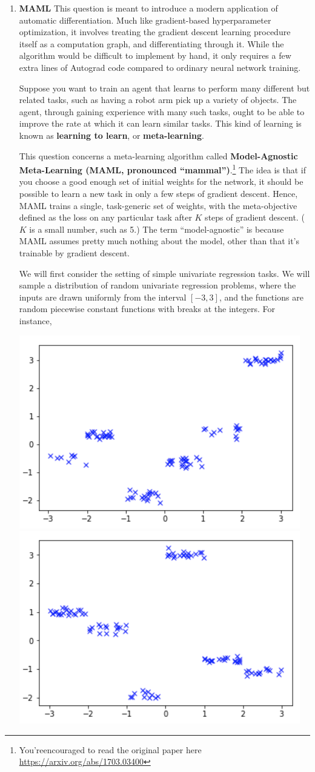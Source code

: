 \documentclass[11pt]{article}
\begin{document}
\begin{enumerate}
\item {\bf MAML} This question is meant to introduce a modern application of automatic differentiation. Much like gradient-based hyperparameter optimization, it involves treating the gradient descent learning procedure itself as a computation graph, and differentiating through it. While the algorithm would be difficult to implement by hand, it only requires a few extra lines of Autograd code compared to ordinary neural network training.

Suppose you want to train an agent that learns to perform many different but related tasks, such as having a robot arm pick up a variety of objects. The agent, through gaining experience with many such tasks, ought to be able to improve the rate at which it can learn similar tasks. This kind of learning is known as \textbf{learning to learn}, or \textbf{meta-learning}.

This question concerns a meta-learning algorithm called \textbf{Model-Agnostic Meta-Learning (MAML, pronounced ``mammal'')}.\footnote{You'reencouraged to read the original paper here \url{https://arxiv.org/abs/1703.03400}} The idea is that if you choose a good enough set of initial weights for the network, it should be possible to learn a new task in only a few steps of gradient descent. Hence, MAML trains a single, task-generic set of weights, with the meta-objective defined as the loss on any particular task after $K$ steps of gradient descent. ($K$ is a small number, such as 5.) The term ``model-agnostic'' is because MAML assumes pretty much nothing about the model, other than that it's trainable by gradient descent.

We will first consider the setting of simple univariate regression tasks. We will sample a distribution of random univariate regression problems, where the inputs are drawn uniformly from the interval $[-3, 3]$, and the functions are random piecewise constant functions with breaks at the integers. For instance,
\begin{center}
\includegraphics[width=0.3 \textwidth]{data1.png}
\includegraphics[width=0.3 \textwidth]{data2.png}
\end{center}


\end{enumerate}
\end{document}
